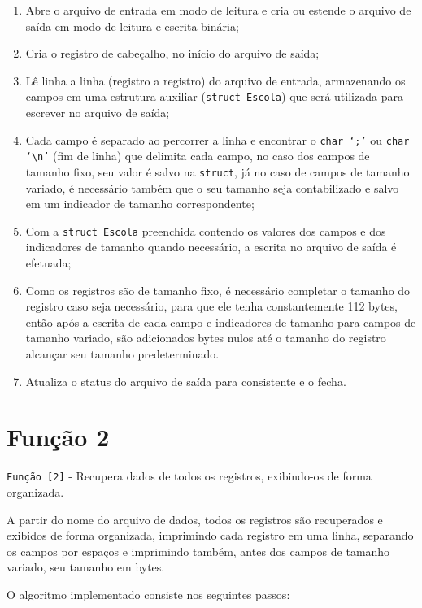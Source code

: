 \documentclass[
	12pt,				%
	openany,			%
	twoside,			%
	a4paper,			%
	english,			%
	french,				%
	spanish,			%
	brazil,				%
]{abntex2}
\begin{document}
		\begin{enumerate}
			\item Abre o arquivo de entrada em modo de leitura e cria ou estende o arquivo de saída em modo de leitura e escrita binária;
			\item Cria o registro de cabeçalho, no início do arquivo de saída;
			\item Lê linha a linha (registro a registro) do arquivo de entrada, armazenando os campos em uma estrutura auxiliar (\verb|struct Escola|) que será utilizada para escrever no arquivo de saída;
			\item Cada campo é separado ao percorrer a linha e encontrar o \verb|char ‘;’| ou \verb|char ‘\n’| (fim de linha) que delimita cada campo, no caso dos campos de tamanho fixo, seu valor é salvo na \verb|struct|, já no caso de campos de tamanho variado, é necessário também que o seu tamanho seja contabilizado e salvo em um indicador de tamanho correspondente;
			\item Com a \verb|struct Escola| preenchida contendo os valores dos campos e dos indicadores de tamanho quando necessário, a escrita no arquivo de saída é efetuada;
			\item Como os registros são de tamanho fixo, é necessário completar o tamanho do registro caso seja necessário, para que ele tenha constantemente 112 bytes, então após a escrita de cada campo e indicadores de tamanho para campos de tamanho variado, são adicionados bytes nulos até o tamanho do registro alcançar seu tamanho predeterminado.
			\item Atualiza o status do arquivo de saída para consistente e o fecha.
		\end{enumerate}

	\section{Função 2}

		\verb|Função [2]| - Recupera dados de todos os registros, exibindo-os de forma organizada.

		A partir do nome do arquivo de dados, todos os registros são recuperados e exibidos de forma organizada, imprimindo cada registro em uma linha, separando os campos por espaços e imprimindo também, antes dos campos de tamanho variado, seu tamanho em bytes.

		O algoritmo implementado consiste nos seguintes passos:
\end{document}

